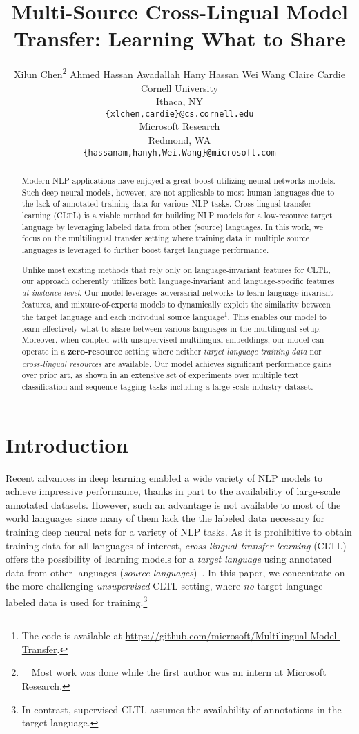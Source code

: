\documentclass[11pt,a4paper]{article}
\title{Multi-Source Cross-Lingual Model Transfer: Learning What to Share}
\author{
Xilun Chen\textsuperscript{\textdagger}\thanks{ \ \ Most work was done while the first author was an intern at Microsoft Research.}
\And
Ahmed Hassan Awadallah\textsuperscript{\textdaggerdbl}
\And
Hany Hassan\textsuperscript{\textdaggerdbl}
\AND
Wei Wang\textsuperscript{\textdaggerdbl}
\And
Claire Cardie\textsuperscript{\textdagger}
\AND
\textnormal{\textsuperscript{\textdagger}Cornell University}\\
Ithaca, NY\\
\small\texttt{\{xlchen,cardie\}@cs.cornell.edu}\\
\And
\textnormal{\textsuperscript{\textdaggerdbl}Microsoft Research}\\
Redmond, WA\\
\small\texttt{\{hassanam,hanyh,Wei.Wang\}@microsoft.com}\\
}
\newcommand{\newterm}[1]{{\bf #1}}
\begin{document}
\maketitle

\begin{abstract}
Modern NLP applications have enjoyed a great boost utilizing neural networks models.
Such deep neural models, however, are not applicable to most human languages due to the lack of annotated training data for various NLP tasks.
Cross-lingual transfer learning (CLTL) is a viable method for building NLP models for a low-resource target language by leveraging labeled data from other (source) languages.
In this work, we focus on the multilingual transfer setting where training data in multiple source languages is leveraged to further boost target language performance.

Unlike most existing methods that rely only on language-invariant features for CLTL, our approach coherently utilizes both language-invariant and language-specific features \emph{at instance level}.
Our model leverages adversarial networks to learn language-invariant features, and mixture-of-experts models to dynamically exploit the similarity between the target language and each individual source language\footnote{The code is available at \url{https://github.com/microsoft/Multilingual-Model-Transfer}.}.
This enables our model to learn effectively what to share between various languages in the multilingual setup. Moreover, when coupled with unsupervised multilingual embeddings, our model can operate in a \newterm{zero-resource} setting where neither \emph{target language training data} nor \emph{cross-lingual resources} are available.
Our model achieves significant performance gains over prior art, as shown in an extensive set of experiments over multiple text classification and sequence tagging tasks including a large-scale industry dataset.
 \end{abstract}

\section{Introduction}\label{sec:intro}
Recent advances in deep learning enabled a wide variety of NLP models to achieve impressive performance, thanks in part to the availability of large-scale annotated datasets.
However, such an advantage is not available to most of the world languages since many of them lack the the labeled data necessary for training deep neural nets for a variety of NLP tasks.
As it is prohibitive to obtain training data for all languages of interest, \emph{cross-lingual transfer learning} (CLTL) offers the possibility of learning models for a \emph{target language} using annotated data from other languages (\emph{source languages})~\citep{H01-1035}.
In this paper, we concentrate on the more challenging \emph{unsupervised} CLTL setting, where \emph{no} target language labeled data is used for training.\footnote{In contrast, supervised CLTL assumes the availability of annotations in the target language.}
\end{document}
